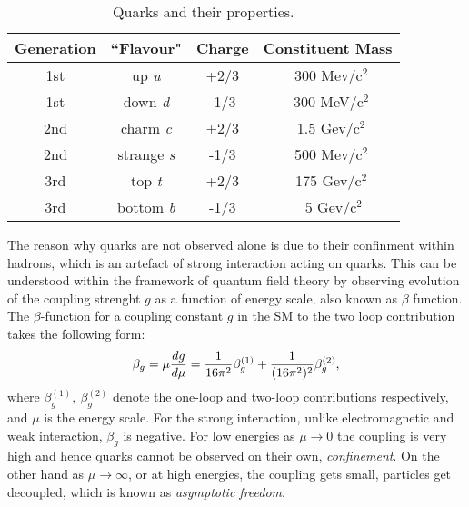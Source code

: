 \begin{table} 

\centering %
\begin{tabular}{|c|c|c|c|} %
\hline %
Generation & ``Flavour" & Charge & Constituent Mass \\ [0.5ex]\hline%
\hline %
1st & up  \textit{u}& +2/3 & ~300 Mev/c$^{2}$ \\ %
1st & down \textit{d}& -1/3 &  ~300 MeV/c$^{2}$ \\[1ex]
2nd & charm \textit{c}& +2/3 &  ~1.5 Gev/c$^{2}$\\ 
2nd & strange \textit{s}& -1/3 &  ~500 Mev/c$^{2}$ \\[1ex]
3rd & top \textit{t}& +2/3 &  ~175 Gev/c$^{2}$ \\ 
3rd & bottom \textit{b}& -1/3 & ~ 5 Gev/c$^{2}$ \\ [1ex] %
\hline %

\end{tabular} 
\caption{Quarks and their properties.} 
\label{nonlin} %
\end{table} 

The reason why quarks are not observed alone is due to their confinment within hadrons, which is an artefact of strong interaction acting on quarks. This can be understood within the framework of quantum field theory by observing evolution of the coupling strenght $g$ as a function of energy scale, also known as $\beta$ function.
The $\beta$-function for a coupling constant $g$ in the SM to the two loop contribution takes the following form:
\begin{equation}
\beta_g = \mu {{d g}\over d \mu} = {1\over16\pi^2} \beta_g^{(1)}
+ {1\over(16\pi^2)^2} \beta_g^{(2)},
\end{equation}
where $\beta_g^{(1)},~ \beta_g^{(2)}$ denote the one-loop and two-loop
contributions respectively, and $\mu$ is the energy scale. For the strong interaction, unlike electromagnetic and weak interaction, $\beta_g$ is negative. For low energies as $\mu \rightarrow 0$ the coupling is very high and hence quarks cannot be observed on their own, \textit{confinement}. On the other hand as $\mu \rightarrow \infty$, or at high energies, the coupling gets small, particles get decoupled, which is known as \textit{asymptotic freedom}. 

